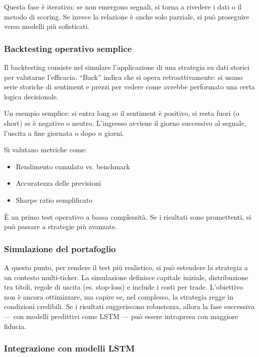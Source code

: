 \documentclass[a4paper,12pt]{article}
\begin{document}
Questa fase è iterativa: se non emergono segnali, si torna a rivedere i dati o il metodo di scoring. Se invece la relazione è anche solo parziale, si può proseguire verso modelli più sofisticati.



\subsubsection{Backtesting operativo semplice}

Il backtesting consiste nel simulare l’applicazione di una strategia su dati storici per valutarne l’efficacia. “Back” indica che si opera retroattivamente: si usano serie storiche di sentiment e prezzi per vedere come avrebbe performato una certa logica decisionale.

Un esempio semplice: si entra long se il sentiment è positivo, si resta fuori (o short) se è negativo o neutro. L’ingresso avviene il giorno successivo al segnale, l’uscita a fine giornata o dopo $n$ giorni.

Si valutano metriche come:
\begin{itemize}
  \item Rendimento cumulato vs. benchmark
  \item Accuratezza delle previsioni
  \item Sharpe ratio semplificato
\end{itemize}

È un primo test operativo a bassa complessità. Se i risultati sono promettenti, si può passare a strategie più avanzate.


\subsubsection{Simulazione del portafoglio}

A questo punto, per rendere il test più realistico, si può estendere la strategia a un contesto multi-ticker. La simulazione definisce capitale iniziale, distribuzione tra titoli, regole di uscita (es. stop-loss) e include i costi per trade. L’obiettivo non è ancora ottimizzare, ma capire se, nel complesso, la strategia regge in condizioni credibili. Se i risultati suggeriscono robustezza, allora la fase successiva — con modelli predittivi come LSTM — può essere intrapresa con maggiore fiducia.

\subsubsection{Integrazione con modelli LSTM}
\end{document}
